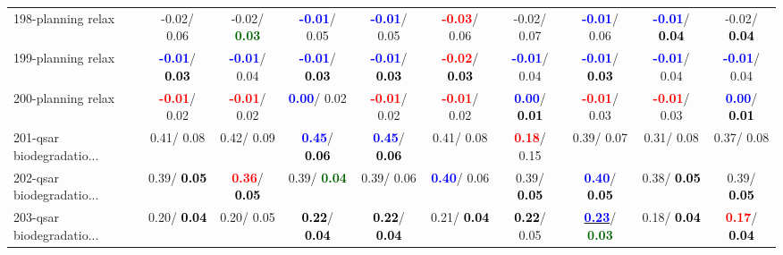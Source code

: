 \begin{table}[h]
\begin{center}
{\begin{tabular}{lc|c|c|c|c|c|c|c|c}
198-planning relax &  -0.02/  0.06 &  -0.02/\textcolor{darkgreen}{\textbf{  0.03}} & \textcolor{blue}{\textbf{ -0.01}}/  0.05 & \textcolor{blue}{\textbf{ -0.01}}/  0.05 & \textcolor{red}{\textbf{ -0.03}}/  0.06 &  -0.02/  0.07 & \textcolor{blue}{\textbf{ -0.01}}/  0.06 & \textcolor{blue}{\textbf{ -0.01}}/\textcolor{black}{\textbf{  0.04}} &  -0.02/\textcolor{black}{\textbf{  0.04}} \\
199-planning relax & \textcolor{blue}{\textbf{ -0.01}}/\textcolor{black}{\textbf{  0.03}} & \textcolor{blue}{\textbf{ -0.01}}/  0.04 & \textcolor{blue}{\textbf{ -0.01}}/\textcolor{black}{\textbf{  0.03}} & \textcolor{blue}{\textbf{ -0.01}}/\textcolor{black}{\textbf{  0.03}} & \textcolor{red}{\textbf{ -0.02}}/\textcolor{black}{\textbf{  0.03}} & \textcolor{blue}{\textbf{ -0.01}}/  0.04 & \textcolor{blue}{\textbf{ -0.01}}/\textcolor{black}{\textbf{  0.03}} & \textcolor{blue}{\textbf{ -0.01}}/  0.04 & \textcolor{blue}{\textbf{ -0.01}}/  0.04 \\ \hline
200-planning relax & \textcolor{red}{\textbf{ -0.01}}/  0.02 & \textcolor{red}{\textbf{ -0.01}}/  0.02 & \textcolor{blue}{\textbf{  0.00}}/  0.02 & \textcolor{red}{\textbf{ -0.01}}/  0.02 & \textcolor{red}{\textbf{ -0.01}}/  0.02 & \textcolor{blue}{\textbf{  0.00}}/\textcolor{black}{\textbf{  0.01}} & \textcolor{red}{\textbf{ -0.01}}/  0.03 & \textcolor{red}{\textbf{ -0.01}}/  0.03 & \textcolor{blue}{\textbf{  0.00}}/\textcolor{black}{\textbf{  0.01}} \\
201-qsar biodegradatio... &   0.41/  0.08 &   0.42/  0.09 & \textcolor{blue}{\textbf{  0.45}}/\textcolor{black}{\textbf{  0.06}} & \textcolor{blue}{\textbf{  0.45}}/\textcolor{black}{\textbf{  0.06}} &   0.41/  0.08 & \textcolor{red}{\textbf{  0.18}}/  0.15 &   0.39/  0.07 &   0.31/  0.08 &   0.37/  0.08 \\
202-qsar biodegradatio... &   0.39/\textcolor{black}{\textbf{  0.05}} & \textcolor{red}{\textbf{  0.36}}/\textcolor{black}{\textbf{  0.05}} &   0.39/\textcolor{darkgreen}{\textbf{  0.04}} &   0.39/  0.06 & \textcolor{blue}{\textbf{  0.40}}/  0.06 &   0.39/\textcolor{black}{\textbf{  0.05}} & \textcolor{blue}{\textbf{  0.40}}/\textcolor{black}{\textbf{  0.05}} &   0.38/\textcolor{black}{\textbf{  0.05}} &   0.39/\textcolor{black}{\textbf{  0.05}} \\
203-qsar biodegradatio... &   0.20/\textcolor{black}{\textbf{  0.04}} &   0.20/  0.05 & \textcolor{black}{\textbf{  0.22}}/\textcolor{black}{\textbf{  0.04}} & \textcolor{black}{\textbf{  0.22}}/\textcolor{black}{\textbf{  0.04}} &   0.21/\textcolor{black}{\textbf{  0.04}} & \textcolor{black}{\textbf{  0.22}}/  0.05 & \underline{\textcolor{blue}{\textbf{  0.23}}}/\textcolor{darkgreen}{\textbf{  0.03}} &   0.18/\textcolor{black}{\textbf{  0.04}} & \textcolor{red}{\textbf{  0.17}}/\textcolor{black}{\textbf{  0.04}} \\

\end{tabular}}
\end{center}
\end{table}
